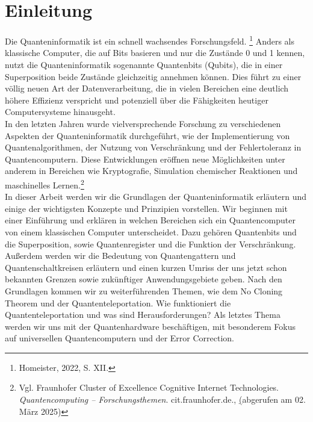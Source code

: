 \section{Einleitung}
\label{sec:einleitung}

Die Quanteninformatik ist ein schnell wachsendes Forschungsfeld. \footnote{Homeister, 2022, S. XII.}
Anders als klassische Computer, die auf Bits basieren und nur die Zustände 0 und 1 kennen, nutzt die Quanteninformatik sogenannte Quantenbits (Qubits), die in einer Superposition beide Zustände gleichzeitig annehmen können.
Dies führt zu einer völlig neuen Art der Datenverarbeitung, die in vielen Bereichen eine deutlich höhere Effizienz verspricht und potenziell über die Fähigkeiten heutiger Computersysteme hinausgeht.\\

In den letzten Jahren wurde vielversprechende Forschung zu verschiedenen Aspekten der Quanteninformatik durchgeführt, wie der Implementierung von Quantenalgorithmen, der Nutzung von Verschränkung und der Fehlertoleranz in Quantencomputern.
Diese Entwicklungen eröffnen neue Möglichkeiten unter anderem in Bereichen wie Kryptografie, Simulation chemischer Reaktionen und maschinelles Lernen.\footnote{Vgl. Fraunhofer Cluster of Excellence Cognitive Internet Technologies. \textit{Quantencomputing – Forschungsthemen}. cit.fraunhofer.de., \href{https://www.cit.fraunhofer.de/de/Forschungsthemen/quantencomputing.html} (abgerufen am 02. März 2025)}\\

In dieser Arbeit werden wir die Grundlagen der Quanteninformatik erläutern und einige der wichtigsten Konzepte und Prinzipien vorstellen.
Wir beginnen mit einer Einführung und erklären in welchen Bereichen sich ein Quantencomputer von einem klassischen Computer unterscheidet.
Dazu gehören Quantenbits und die Superposition, sowie Quantenregister und die Funktion der Verschränkung.
Außerdem werden wir die Bedeutung von Quantengattern und Quantenschaltkreisen erläutern und einen kurzen Umriss der uns jetzt schon bekannten Grenzen sowie zukünftiger Anwendungsgebiete geben.
Nach den Grundlagen kommen wir zu weiterführenden Themen, wie dem No Cloning Theorem und der Quantenteleportation.
Wie funktioniert die Quantenteleportation und was sind Herausforderungen?
Als letztes Thema werden wir uns mit der Quantenhardware beschäftigen, mit besonderem Fokus auf universellen Quantencomputern und der Error Correction.

